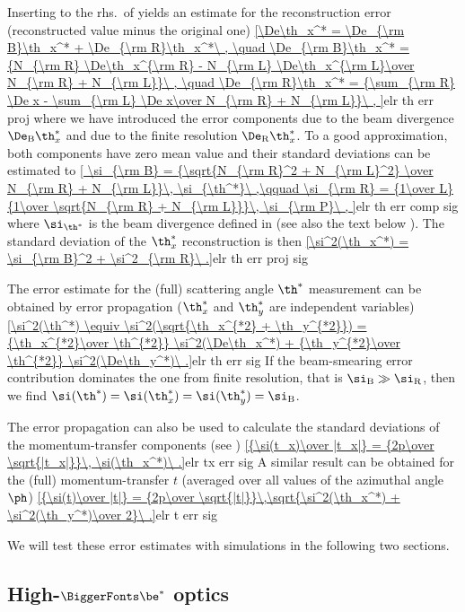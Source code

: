 Inserting  to the rhs.~of  yields an estimate for the reconstruction error (reconstructed value minus the original one)
\eqref{\De\th_x^* = \De_{\rm B}\th_x^* + \De_{\rm R}\th_x^*\ ,
	\quad \De_{\rm B}\th_x^* = {N_{\rm R} \De\th_x^{\rm R} - N_{\rm L} \De\th_x^{\rm L}\over N_{\rm R} + N_{\rm L}}\ ,
	\quad \De_{\rm R}\th_x^* = {\sum_{\rm R} \De x - \sum_{\rm L} \De x\over  N_{\rm R} + N_{\rm L}}\ ,
}{elr th err proj}
where we have introduced the error components due to the beam divergence $\De_{\rm B}\th_x^*$ and due to the finite resolution $\De_{\rm R}\th_x^*$. To a good approximation, both components have zero mean value and their standard deviations can be estimated to
\eqref{
	\si_{\rm B} = {\sqrt{N_{\rm R}^2 + N_{\rm L}^2} \over N_{\rm R} + N_{\rm L}}\, \si_{\th^*}\ ,\qquad
	\si_{\rm R} = {1\over L} {1\over \sqrt{N_{\rm R} + N_{\rm L}}}\, \si_{\rm P}\ ,
}{elr th err comp sig}
where $\si_{\th^*}$ is the beam divergence defined in  (see also the text below ). The standard deviation of the $\th_x^*$ reconstruction is then
\eqref{\si^2(\th_x^*) = \si_{\rm B}^2 + \si^2_{\rm R}\ .}{elr th err proj sig}

The error estimate for the (full) scattering angle $\th^*$ measurement can be obtained by error propagation ($\th_x^*$ and $\th_y^*$ are independent variables)
\eqref{\si^2(\th^*) \equiv \si^2(\sqrt{\th_x^{*2} + \th_y^{*2}}) = {\th_x^{*2}\over \th^{*2}} \si^2(\De\th_x^*) + {\th_y^{*2}\over \th^{*2}} \si^2(\De\th_y^*)\ .}{elr th err sig}
If the beam-smearing error contribution dominates the one from finite resolution, that is $\si_{\rm B} \gg \si_{\rm R}$, then we find $\si(\th^*) = \si(\th_x^*) = \si(\th_y^*) = \si_{\rm B}$.

The error propagation can also be used to calculate the standard deviations of the momentum-transfer components (see )
\eqref{{\si(t_x)\over |t_x|} = {2p\over \sqrt{|t_x|}}\, \si(\th_x^*)\ .}{elr tx err sig}
A similar result can be obtained for the (full) momentum-transfer $t$ (averaged over all values of the azimuthal angle $\ph$)
\eqref{{\si(t)\over |t|} = {2p\over \sqrt{|t|}}\,\sqrt{\si^2(\th_x^*) + \si^2(\th_y^*)\over 2}\ .}{elr t err sig}

We will test these error estimates with  simulations in the following two sections.


\def\OutlineLabel{High-beta* optics}
\def\TOCLabel{High-$\be^*$ optics}
\subsection[elr 1535]{High-$\BiggerFonts\mathbf\be^*$ optics}

